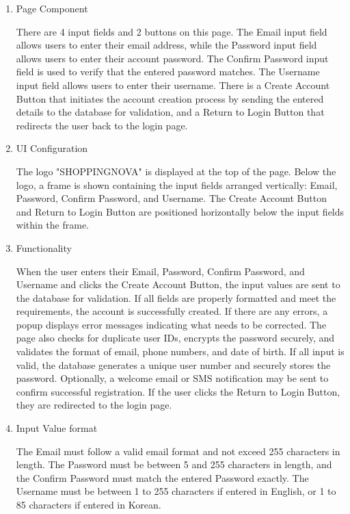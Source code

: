 \documentclass[conference]{IEEEtran}
\begin{document}
\begin{enumerate}
\setlength{\parindent}{2ex}
\setlength{\parskip}{0.5em}
\item Page Component

There are 4 input fields and 2 buttons on this page. The Email input field allows users to enter their email address, while the Password input field allows users to enter their account password. The Confirm Password input field is used to verify that the entered password matches. The Username input field allows users to enter their username. There is a Create Account Button that initiates the account creation process by sending the entered details to the database for validation, and a Return to Login Button that redirects the user back to the login page.

\item UI Configuration

The logo "SHOPPINGNOVA" is displayed at the top of the page. Below the logo, a frame is shown containing the input fields arranged vertically: Email, Password, Confirm Password, and Username. The Create Account Button and Return to Login Button are positioned horizontally below the input fields within the frame.

\item Functionality

When the user enters their Email, Password, Confirm Password, and Username and clicks the Create Account Button, the input values are sent to the database for validation. If all fields are properly formatted and meet the requirements, the account is successfully created. If there are any errors, a popup displays error messages indicating what needs to be corrected. The page also checks for duplicate user IDs, encrypts the password securely, and validates the format of email, phone numbers, and date of birth. If all input is valid, the database generates a unique user number and securely stores the password. Optionally, a welcome email or SMS notification may be sent to confirm successful registration. If the user clicks the Return to Login Button, they are redirected to the login page.

\item Input Value format

The Email must follow a valid email format and not exceed 255 characters in length. The Password must be between 5 and 255 characters in length, and the Confirm Password must match the entered Password exactly. The Username must be between 1 to 255 characters if entered in English, or 1 to 85 characters if entered in Korean.
\end{enumerate}
\end{document}
